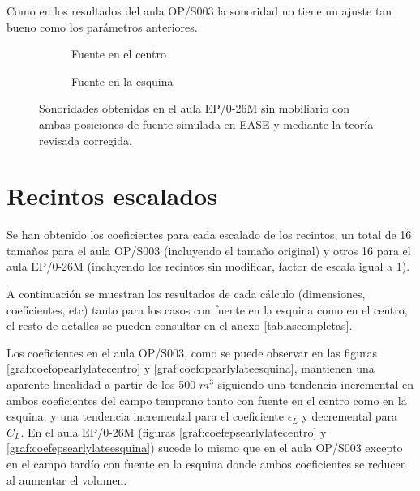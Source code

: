 Como en los resultados del aula OP/S003 la sonoridad no tiene un ajuste tan bueno como los parámetros anteriores.

\begin{figure}[ht]
    \begin{subfigure}[b]{0.4\textwidth}
    	\centering%
         {%
    }
    \caption{Fuente en el centro}%
    \end{subfigure}%
    \hspace{1.9cm}%
    \begin{subfigure}[b]{0.4\textwidth}%
    	\centering%
        {%
    }
    \caption{Fuente en la esquina}%
    \end{subfigure}
    \caption{Sonoridades obtenidas en el aula EP/0-26M sin mobiliario con ambas posiciones de fuente simulada en EASE y mediante la teoría revisada corregida.}
\label{graf:sonoridadepsesquina}%
\end{figure}
\FloatBarrier 

\newpage
\section{Recintos escalados}

Se han obtenido los coeficientes para cada escalado de los recintos, un total de 16 tamaños para el aula OP/S003 (incluyendo el tamaño original) y otros 16 para el aula EP/0-26M (incluyendo los recintos sin modificar, factor de escala igual a 1).

A continuación se muestran los resultados de cada cálculo (dimensiones, coeficientes, etc) tanto para los casos con fuente en la esquina como en el centro, el resto de detalles se pueden consultar en el anexo \ref{tablascompletas}.
\\
\par
Los coeficientes en el aula OP/S003, como se puede observar en las figuras \ref{graf:coefopearlylatecentro} y \ref{graf:coefopearlylateesquina}, mantienen una aparente linealidad a partir de los 500 $m^3$ siguiendo una tendencia incremental en ambos coeficientes del campo temprano tanto con fuente en el centro como en la esquina, y una tendencia incremental para el coeficiente $\epsilon_L$ y decremental para $C_L$. 
En el aula EP/0-26M (figuras \ref{graf:coefepsearlylatecentro} y \ref{graf:coefepsearlylateesquina}) sucede lo mismo que en el aula OP/S003 excepto en el campo tardío con fuente en la esquina donde ambos coeficientes se reducen al aumentar el volumen.


